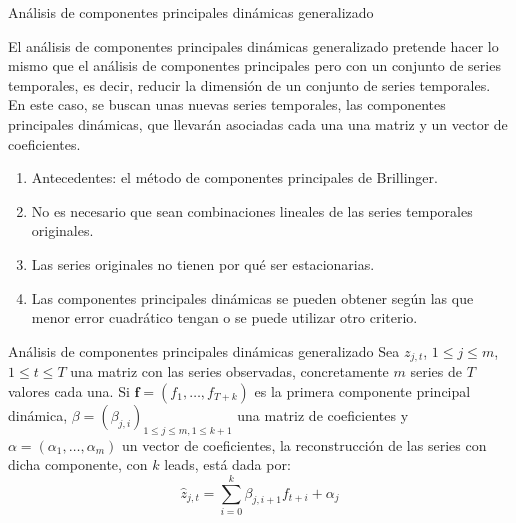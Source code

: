 \documentclass[leqno]{beamer}
\begin{document}
\begin{frame}{Análisis de componentes principales dinámicas generalizado}

El análisis de componentes principales dinámicas generalizado pretende hacer lo mismo que el análisis de componentes principales pero con un conjunto de series temporales, es decir, reducir la dimensión de un conjunto de series temporales. En este caso, se buscan unas nuevas series temporales, las componentes principales dinámicas, que llevarán asociadas cada una una matriz y un vector de coeficientes.\\

\begin{enumerate}
\item Antecedentes: el método de componentes principales de Brillinger.
\item No es necesario que sean combinaciones lineales de las series temporales originales. 
\item Las series originales no tienen por qué ser estacionarias.
\item Las componentes principales dinámicas se pueden obtener según las que menor error cuadrático tengan o se puede utilizar otro criterio.
\end{enumerate}

\end{frame}


\begin{frame}{Análisis de componentes principales dinámicas generalizado}
Sea $z_{j,t}$, $1 \leq j \leq m$, $1 \leq t \leq T$ una matriz con las series observadas, concretamente $m$ series de $T$ valores cada una.
Si $\mathbf{f} = (f_1, \dots, f_{T+k})$ es la primera componente principal dinámica, $\beta = (\beta_{j,i})_{1 \leq j \leq m, 1 \leq k+1}$ una matriz de coeficientes y $\alpha = (\alpha_1, \dots, \alpha_m)$ un vector de coeficientes, la reconstrucción de las series con dicha componente, con $k$ leads, está dada por:
\begin{equation}
\widehat{z}_{j,t} = \sum_{i=0}^{k} \beta_{j,i+1}f_{t+i} + \alpha_j
\end{equation}
\end{frame}
\end{document}
